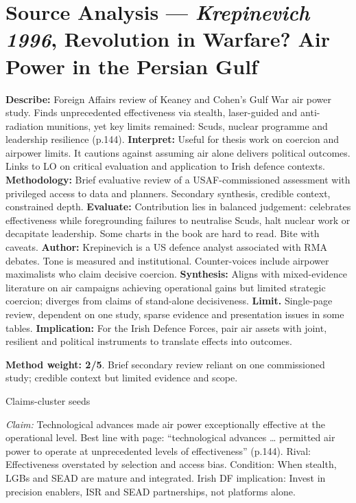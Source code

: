 \section*{Source Analysis — \textit{Krepinevich 1996}, Revolution in Warfare? Air Power in the Persian Gulf}
\textbf{Describe:} Foreign Affairs review of Keaney and Cohen’s Gulf War air power study. Finds unprecedented effectiveness via stealth, laser-guided and anti-radiation munitions, yet key limits remained: Scuds, nuclear programme and leadership resilience (p.144).
\textbf{Interpret:} Useful for thesis work on coercion and airpower limits. It cautions against assuming air alone delivers political outcomes. Links to LO on critical evaluation and application to Irish defence contexts.
\textbf{Methodology:} Brief evaluative review of a USAF-commissioned assessment with privileged access to data and planners. Secondary synthesis, credible context, constrained depth.
\textbf{Evaluate:} Contribution lies in balanced judgement: celebrates effectiveness while foregrounding failures to neutralise Scuds, halt nuclear work or decapitate leadership. Some charts in the book are hard to read. Bite with caveats.
\textbf{Author:} Krepinevich is a US defence analyst associated with RMA debates. Tone is measured and institutional. Counter-voices include airpower maximalists who claim decisive coercion.
\textbf{Synthesis:} Aligns with mixed-evidence literature on air campaigns achieving operational gains but limited strategic coercion; diverges from claims of stand-alone decisiveness.
\textbf{Limit.} Single-page review, dependent on one study, sparse evidence and presentation issues in some tables.
\textbf{Implication:} For the Irish Defence Forces, pair air assets with joint, resilient and political instruments to translate effects into outcomes.

\textbf{Method weight: 2/5}. Brief secondary review reliant on one commissioned study; credible context but limited evidence and scope.

Claims-cluster seeds

\textit{Claim:} Technological advances made air power exceptionally effective at the operational level.
Best line with page: “technological advances … permitted air power to operate at unprecedented levels of effectiveness” (p.144). Rival: Effectiveness overstated by selection and access bias. Condition: When stealth, LGBs and SEAD are mature and integrated. Irish DF implication: Invest in precision enablers, ISR and SEAD partnerships, not platforms alone.

